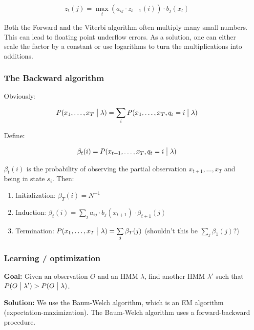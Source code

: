 \documentclass[11pt]{article}
\begin{document}
\begin{equation}
    z_t(j) = \max_i(a_{ij} \cdot z_{t-1}(i)) \cdot b_j(x_t)
\end{equation}

Both the Forward and the Viterbi algorithm often multiply many small numbers. This can lead to floating point underflow errors. As a solution, one can either scale the factor by a constant or use logarithms to turn the multiplications into additions.

\subsubsection{The Backward algorithm}

Obviously:

\begin{equation}
    P(x_1, \ldots, x_T \bigm| \lambda) = \sum\limits_i P(x_1, \ldots, x_T, q_t = i \bigm| \lambda)
\end{equation}

Define:

\begin{equation}
    \beta_t(i) = P(x_{t+1}, \ldots, x_T, q_t = i \bigm| \lambda)
\end{equation}

\vspace{10pt}

$\beta_t(i)$ is the probability of observing the partial observation $x_{t+1}, \ldots, x_T$ and being in state $s_i$. Then:

\begin{enumerate}
    \item Initialization: $\beta_T(i) = N^{-1}$
    \item Induction: $\beta_t(i) = \sum\limits_j a_{ij} \cdot b_j(x_{t+1}) \cdot \beta_{t+1}(j)$
    \item Termination: $P(x_1, \ldots, x_T \bigm| \lambda) = \sum\limits_j \beta_T(j)$ (shouldn't this be $\sum\limits_j \beta_1(j)$?)
\end{enumerate}

\subsubsection{Learning / optimization}

\textbf{Goal:} Given an observation $O$ and an HMM $\lambda$, find another HMM $\lambda'$ such that $P(O \bigm| \lambda') > P(O \bigm| \lambda)$.

\textbf{Solution:} We use the Baum-Welch algorithm, which is an EM algorithm (expectation-maximization). The Baum-Welch algorithm uses a forward-backward procedure.
\end{document}

